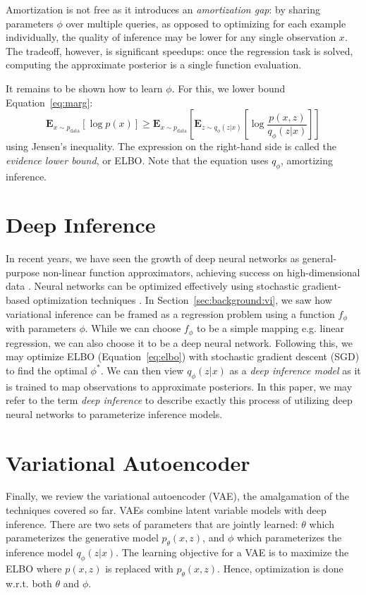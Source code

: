Amortization is not free as it introduces an \textit{amortization gap}: by sharing parameters $\phi$ over multiple queries, as opposed to optimizing for each example individually, the quality of inference may be lower for any single observation $x$. The tradeoff, however, is significant speedups: once the regression task is solved, computing the approximate posterior is a single function evaluation.

It remains to be shown how to learn $\phi$. For this, we lower bound Equation~\ref{eq:marg}:
\begin{equation}
    \mathbf{E}_{x \sim p_{\text{data}}}\left[\log p(x) \right] \geq \mathbf{E}_{x \sim p_{\text{data}}}\left[\mathbf{E}_{z\sim q_\phi(z|x)}\left[\log \frac{p(x,z)}{q_\phi(z|x)}\right]\right]
    \label{eq:elbo}
\end{equation}
using Jensen's inequality. The expression on the right-hand side is called the \textit{evidence lower bound}, or ELBO. Note that the equation uses $q_\phi$, amortizing inference.

\section{Deep Inference}
\label{sec:background:deepinf}
In recent years, we have seen the growth of deep neural networks as general-purpose non-linear function approximators, achieving success on high-dimensional data \cite{lecun2015deep}. Neural networks can be optimized effectively using stochastic gradient-based optimization techniques \cite{ruder2016overview}. In Section~\ref{sec:background:vi}, we saw how variational inference can be framed as a regression problem using a function $f_\phi$ with parameters $\phi$. While we can choose $f_\phi$ to be a simple mapping e.g. linear regression, we can also choose it to be a deep neural network. Following this, we may optimize ELBO (Equation~\ref{eq:elbo}) with stochastic gradient descent (SGD) to find the optimal $\phi^*$. We can then view $q_\phi(z|x)$ as a \textit{deep inference model} as it is trained to map observations to approximate posteriors. In this paper, we may refer to the term \textit{deep inference} to describe exactly this process of utilizing deep neural networks to parameterize inference models.

\section{Variational Autoencoder}

Finally, we review the variational autoencoder (VAE), the amalgamation of the techniques covered so far. VAEs \cite{kingma2013auto,rezende2014stochastic} combine latent variable models with deep inference. There are two sets of parameters that are jointly learned: $\theta$ which parameterizes the generative model $p_\theta(x,z)$, and $\phi$ which parameterizes the inference model $q_\phi(z|x)$. The learning objective for a VAE is to maximize the ELBO where $p(x,z)$ is replaced with $p_\theta(x,z)$. Hence, optimization is done w.r.t. both $\theta$ and $\phi$. 

